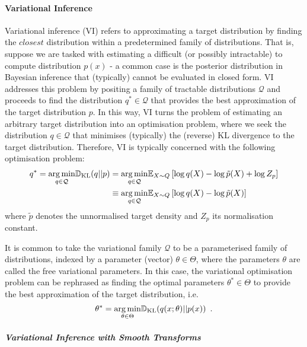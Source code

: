 \paragraph*{Variational Inference}

Variational inference (VI) refers to approximating a target distribution by finding the $\textit{closest}$ distribution within a predetermined family of distributions. That is, suppose we are tasked with estimating a difficult (or possibly intractable) to compute distribution $p(x)$ - a common case is the posterior distribution in Bayesian inference that (typically) cannot be evaluated in closed form. VI addresses this problem by positing a family of tractable distributions $\mathcal{Q}$ and proceeds to find the distribution $q^* \in \mathcal{Q}$ that provides the best approximation of the target distribution $p$. In this way, VI turns the problem of estimating an arbitrary target distribution into an optimisation problem, where we seek the distribution $q \in \mathcal{Q}$ that minimises (typically) the (reverse) KL divergence to the target distribution. Therefore, VI is typically concerned with the following optimisation problem:
\begin{align*} 
q^* = \underset{q \in \mathcal{Q}}{\operatorname*{arg\,min}} \mathbb{D}_{\text{KL}}(q||p) &= \underset{q \in \mathcal{Q}}{\operatorname*{arg\,min}} \mathbb{E}_{X \sim Q} \left[\log q(X) - \log \tilde{p}(X) + \log Z_p\right]\\
&\equiv \underset{q \in \mathcal{Q}}{\operatorname*{arg\,min}} \mathbb{E}_{X \sim Q} \left[\log q(X) - \log \tilde{p}(X) \right]
\end{align*}
where $\tilde{p}$ denotes the unnormalised target density and $Z_p$ its normalisation constant.

It is common to take the variational family $\mathcal{Q}$ to be a parameterised family of distributions, indexed by a parameter (vector) $\theta \in \Theta$, where the parameters $\theta$ are called the free variational parameters. In this case, the variational optimisation problem can be rephrased as finding the optimal parameters $\theta^* \in \Theta$ to provide the best approximation of the target distribution, i.e.
\begin{equation*}
\theta^* = \underset{\theta \in \Theta}{\operatorname*{arg\,min}} \mathbb{D}_{\text{KL}}(q(x; \theta) || p(x)) \enspace.
\end{equation*}

\subparagraph*{Variational Inference with Smooth Transforms}

